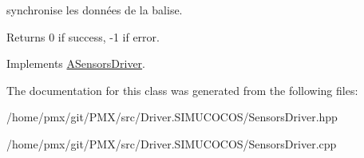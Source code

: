 synchronise les données de la balise. 

\begin{DoxyReturn}{Returns}
0 if success, -\/1 if error. 
\end{DoxyReturn}


Implements \hyperlink{classASensorsDriver_a0c581029ba10d5ac820a9e3e2e6883cd}{A\+Sensors\+Driver}.



The documentation for this class was generated from the following files\+:\begin{DoxyCompactItemize}
\item 
/home/pmx/git/\+P\+M\+X/src/\+Driver.\+S\+I\+M\+U\+C\+O\+C\+O\+S/Sensors\+Driver.\+hpp\item 
/home/pmx/git/\+P\+M\+X/src/\+Driver.\+S\+I\+M\+U\+C\+O\+C\+O\+S/Sensors\+Driver.\+cpp\end{DoxyCompactItemize}
